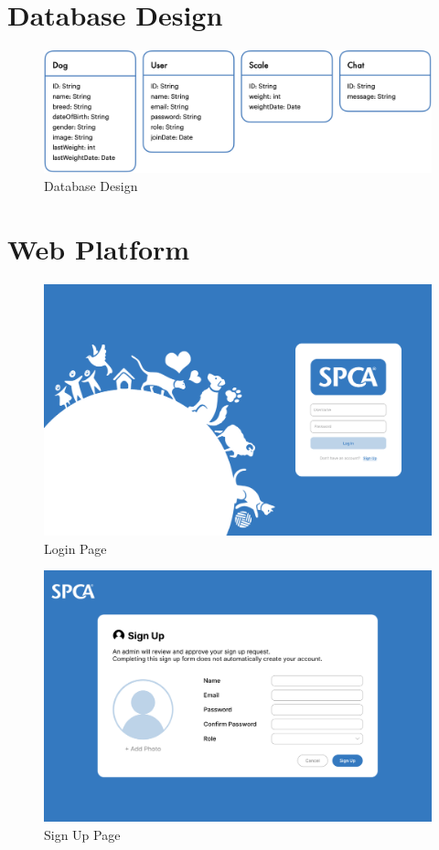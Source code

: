 \chapter{Database Design}

\begin{figure}[h]
\centering
\includegraphics[width=\textwidth]{proposal/parts/database.png}
\caption{Database Design}
\label{figure:database}
\end{figure}

\chapter{Web Platform}

\begin{figure}[h]
\centering
\includegraphics[width=\textwidth]{proposal/parts/login.png}
\caption{Login Page}
\label{figure:login}
\end{figure}

\begin{figure}[h]
\centering
\includegraphics[width=\textwidth]{proposal/parts/sign-up.png}
\caption{Sign Up Page}
\label{figure:sign up}
\end{figure}


